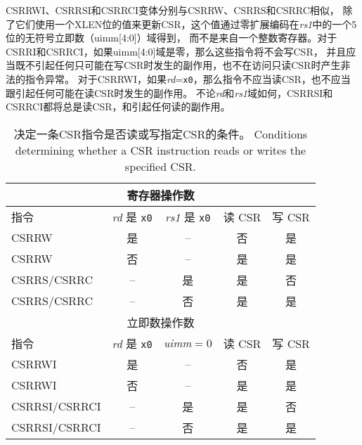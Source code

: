 CSRRWI、CSRRSI和CSRRCI变体分别与CSRRW、CSRRS和CSRRC相似，
除了它们使用一个XLEN位的值来更新CSR，这个值通过零扩展编码在{\em rs1}中的一个5位的无符号立即数（uimm[4:0]）域得到，
而不是来自一个整数寄存器。对于CSRRI和CSRRCI，如果uimm[4:0]域是零，那么这些指令将不会写CSR，
并且应当既不引起任何只可能在写CSR时发生的副作用，也不在访问只读CSR时产生非法的指令异常。
对于CSRRWI，如果{\em rd}={\tt x0}，那么指令不应当读CSR，也不应当跟引起任何可能在读CSR时发生的副作用。
不论{\em rd}和{\em rs1}域如何，CSRRSI和CSRRCI都将总是读CSR，和引起任何读的副作用。

\begin{table}
  \centering
  \begin{tabular}{|l|c|c|c|c|}
    \hline
    \multicolumn{5}{|c|}{寄存器操作数} \\
    \hline
    指令 & \textit{rd} 是 \texttt{x0}
                      & \textit{rs1} 是 \texttt{x0}
                            & 读 CSR & 写 CSR \\
    \hline
    CSRRW       & 是 & --  & 否  & 是 \\
    CSRRW       & 否  & --  & 是 & 是 \\
    CSRRS/CSRRC & --  & 是 & 是 & 否 \\
    CSRRS/CSRRC & --  & 否  & 是 & 是 \\
    \hline
    \multicolumn{5}{|c|}{立即数操作数} \\
    \hline
    指令 & \textit{rd} 是 \texttt{x0}
                        & \textit{uimm}$=$0
                              & 读 CSR & 写 CSR \\
    \hline
    CSRRWI        & 是 & --  & 否  & 是 \\
    CSRRWI        & 否  & --  & 是 & 是 \\
    CSRRSI/CSRRCI & --  & 是 & 是 & 否 \\
    CSRRSI/CSRRCI & --  & 否  & 是 & 是 \\
    \hline
  \end{tabular}
  \caption{决定一条CSR指令是否读或写指定CSR的条件。  Conditions determining whether a CSR instruction reads or writes
    the specified CSR.}
  \label{tab:csrsideeffects}
\end{table}

